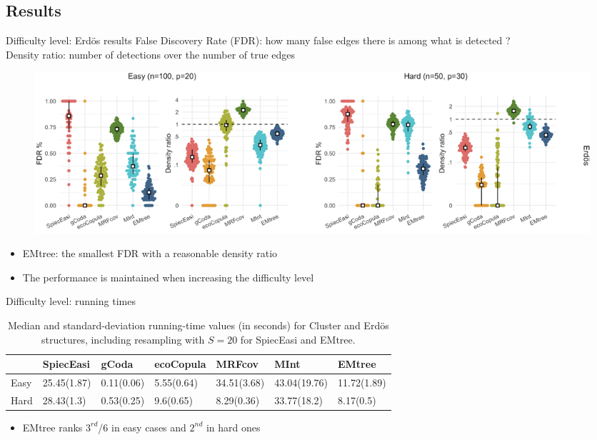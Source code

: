 \documentclass[11pt]{beamer}
\newcommand{\bleu}[1]{\textcolor{Framableulight}{#1}}
\begin{document}
\subsection{Results}
\begin{frame}{Difficulty level: Erdös results}
\footnotesize{\bleu{False Discovery Rate (FDR):} how many false edges there is among what is detected ?\\
\bleu{Density ratio:} number of detections over the number of true edges}

\begin{figure}
    \centering
       \includegraphics[width=\linewidth]{panelTPFN_signed_erdos} 
\end{figure}
\begin{itemize}
    \item EMtree: the smallest FDR with a reasonable density ratio
    \item The performance is maintained when increasing the difficulty level
\end{itemize}
\end{frame}
\begin{frame}{Difficulty level: running times}

\scriptsize
\begin{table}[ht]
\centering
\begin{tabular}{l|llllll}

 & SpiecEasi & gCoda & ecoCopula & MRFcov & MInt & EMtree \\ 
  \hline
Easy & 25.45(1.87) & 0.11(0.06) & 5.55(0.64) & 34.51(3.68) & 43.04(19.76) & 11.72(1.89) \\ 
  Hard & 28.43(1.3) & 0.53(0.25) & 9.6(0.65) & 8.29(0.36) & 33.77(18.2) & 8.17(0.5) \\ 
   \hline
\end{tabular}
\caption{Median and standard-deviation running-time values (in seconds) for Cluster and Erdös structures, including resampling with $S=20$ for SpiecEasi and EMtree.}
\label{timesTPFN}
\end{table}
\normalsize
\begin{itemize}
\item EMtree ranks $3^{rd}$/6 in easy cases and $2^{nd}$ in hard ones 
\end{itemize}
\end{frame}
\end{document}
